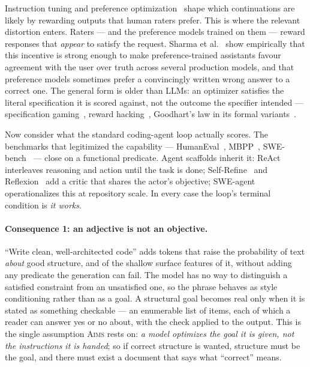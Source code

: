\documentclass[11pt]{article}
\newcommand{\aims}{\textsc{Aims}}
\begin{document}
Instruction tuning and preference optimization~\cite{ouyang2022training} shape which continuations are likely by rewarding outputs that human raters prefer. This is where the relevant distortion enters. Raters --- and the preference models trained on them --- reward responses that \emph{appear} to satisfy the request. Sharma et al.~\cite{sharma2023sycophancy} show empirically that this incentive is strong enough to make preference-trained assistants favour agreement with the user over truth across several production models, and that preference models sometimes prefer a convincingly written wrong answer to a correct one. The general form is older than LLMs: an optimizer satisfies the literal specification it is scored against, not the outcome the specifier intended --- specification gaming~\cite{krakovna2020specification}, reward hacking~\cite{amodei2016concrete}, Goodhart's law in its formal variants~\cite{manheim2019categorizing}.

Now consider what the standard coding-agent loop actually scores. The benchmarks that legitimized the capability --- HumanEval~\cite{chen2021codex}, MBPP~\cite{austin2021program}, SWE-bench~\cite{jimenez2024swebench} --- close on a functional predicate. Agent scaffolds inherit it: ReAct~\cite{yao2023react} interleaves reasoning and action until the task is done; Self-Refine~\cite{madaan2023selfrefine} and Reflexion~\cite{shinn2023reflexion} add a critic that shares the actor's objective; SWE-agent~\cite{yang2024sweagent} operationalizes this at repository scale. In every case the loop's terminal condition is \emph{it works}.

\paragraph{Consequence 1: an adjective is not an objective.} ``Write clean, well-architected code'' adds tokens that raise the probability of text \emph{about} good structure, and of the shallow surface features of it, without adding any predicate the generation can fail. The model has no way to distinguish a satisfied constraint from an unsatisfied one, so the phrase behaves as style conditioning rather than as a goal. A structural goal becomes real only when it is stated as something checkable --- an enumerable list of items, each of which a reader can answer yes or no about, with the check applied to the output. This is the single assumption \aims{} rests on: \emph{a model optimizes the goal it is given, not the instructions it is handed}; so if correct structure is wanted, structure must be the goal, and there must exist a document that says what ``correct'' means.
\end{document}
